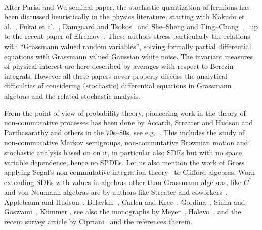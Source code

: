 \documentclass{article}
\begin{document}
\

After Parisi and Wu seminal paper, the stochastic quantization of fermions
has been discussed heuristically in the physics literature, starting with
Kakudo et al.~{\cite{kakudo1983gauge}}, Fukai et
al.~{\cite{fukai_stochastic_1983}}, Damgaard and
Tsokos~{\cite{damgaard_stochastic_1984}} and She--Sheng and
Ting--Chang~{\cite{she-sheng_stochastic_1985}}, \ up to the recent paper of
Efremov~{\cite{efremov_stochastic_2019}}. These authors stress particularly
the relations with ``Grassmann valued random variables'', solving formally
partial differential equations with Grassmann valued Gaussian white noise. The
invariant measures of physical interest are here described by averages with
respect to Berezin integrals. However all these papers never properly discuss
the analytical difficulties of considering (stochastic) differential equations
in Grassmann algebras and the related stochastic analysis.

From the point of view of probability theory, pioneering work in the theory of
non-commutative processes has been done by Accardi, Streater and Hudson and
Parthasarathy and others in the 70s--80s, see
e.g.~{\cite{accardi_outline_2015,parthasarathy_introduction_1992,streater_classical_2000,biane_calcul_1995}}.
This includes the study of non-commutative Markov semigroups, non-commutative
Brownian motion and stochastic analysis based on on it, in particular also
SDEs but with no space variable dependence, hence no SPDEs. Let us also
mention the work of
Gross~{\cite{gross_noncommutative_1971,gross_existence_1972,gross_hypercontractivity_1975,gross_formula_1977}}
applying Segal's non-commutative integration
theory~{\cite{segal_non_commutative_1953,nelson_notes_1974}} to Clifford
algebras. Work extending SDEs with values in algebras other than Grassmann
algebras, like $C^{\ast}$ and von Neumann algebras are by authors like
Streater and coworkers~{\cite{Streater1,Streater2,Streater3}}, Applebaum and
Hudson~{\cite{Applebaum1,Applebaum2}}, Belavkin~{\cite{Belavkin}}, Carlen and
Kree~{\cite{Carlen1}}, Gordina~{\cite{Gordina}}, Sinha and
Goswami~{\cite{Sinha}}, K{\"u}mmer {\cite{Kummer}}, see also the monographs by
Meyer~{\cite{Meyerbook}}, Holevo~{\cite{Holevo}}, and the recent survey
article by Cipriani~{\cite{Cipriani}} and the references therein.
\end{document}
